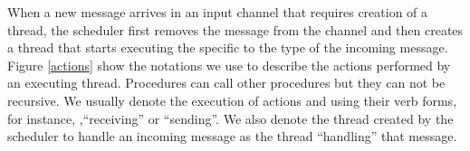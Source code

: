 When a new message arrives in an input channel that requires creation of a
thread, the scheduler first removes the message from the channel and then
creates a thread that starts executing the \procedure{} specific to the type of
the incoming message. Figure \ref{actions} show the notations we use to
describe the actions performed by an executing thread. Procedures can call
other procedures but they can not be recursive. We usually denote the execution
of actions \receive{} and \send{} using their verb forms, for instance,
,``receiving'' or ``sending''. We also denote the thread created by the
scheduler to handle an incoming message as the thread ``handling'' that
message.
